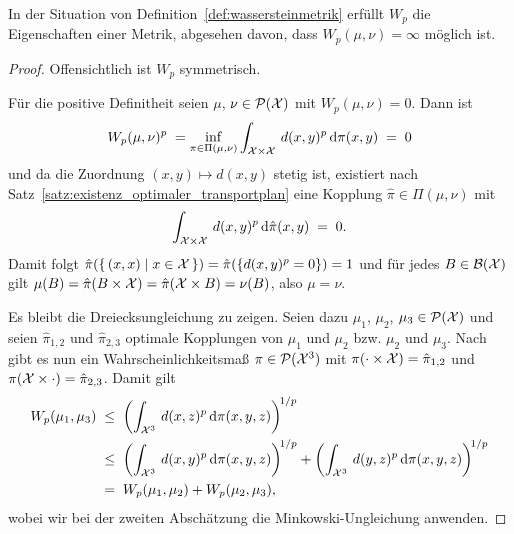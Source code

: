 \documentclass[../thesis/thesis.tex]{subfiles}
\begin{document}
	\begin{Satz}
		\label{satz:wassersteinmetrik_ist_metrik}
		In der Situation von Definition~\ref{def:wassersteinmetrik} erfüllt $W_p$ die Eigenschaften einer Metrik, abgesehen davon, dass $W_p(\mu, \nu) = \infty$ möglich ist.
	\end{Satz}

	\begin{proof}
		Offensichtlich ist $W_p$ symmetrisch.
		
		Für die positive Definitheit seien $\mu$, $\nu \in \mathcal{P}(\mathcal{X})$ mit $W_p(\mu, \nu) = 0$. Dann ist
		\[ W_p(\mu, \nu)^p \; = \inf_{\pi \in \Pi(\mu, \nu)} \int_{\mathcal{X} \times \mathcal{X}} \, d(x, y)^p \, \mathrm{d}\pi(x, y) \; = \; 0 \]
		und da die Zuordnung $(x, y) \mapsto d(x, y)$ stetig ist, existiert nach Satz~\ref{satz:existenz_optimaler_transportplan} eine Kopplung $\hat{\pi} \in \Pi(\mu, \nu)$ mit
		\[ \int_{\mathcal{X} \times \mathcal{X}} \, d(x, y)^p \, \mathrm{d}\hat{\pi}(x, y) \; = \; 0 \text{.} \]
		Damit folgt $\hat{\pi}(\left\{\, (x, x) \; \middle| \; x \in \mathcal{X} \,\right\}) = \hat{\pi}(\left\{d(x, y)^p = 0\right\}) = 1$ und für jedes $B \in \mathcal{B}(\mathcal{X})$ gilt
		$\mu(B) = \hat{\pi}(B \times \mathcal{X}) = \hat{\pi}(\mathcal{X} \times B) = \nu(B)$, also $\mu = \nu$.
		
		Es bleibt die Dreiecksungleichung zu zeigen. Seien dazu $\mu_1$, $\mu_2$, $\mu_3 \in \mathcal{P}(\mathcal{X})$ und seien $\hat{\pi}_{1, 2}$ und $\hat{\pi}_{2, 3}$ optimale Kopplungen von
		$\mu_1$ und $\mu_2$ bzw. $\mu_2$ und $\mu_3$. Nach \cite[S. 11--12]{Villani.2009} gibt es nun ein Wahrscheinlichkeitsmaß $\pi \in \mathcal{P}(\mathcal{X}^3)$ mit 
		$\pi(\cdot \times \mathcal{X}) = \hat{\pi}_{1, 2}$ und $\pi(\mathcal{X} \times \cdot) = \hat{\pi}_{2, 3}$. Damit gilt
		\begin{align*}
			W_p(\mu_1, \mu_3) \; &\leq \; \left(\int_{\mathcal{X}^3} \, d(x, z)^p \, \mathrm{d}\pi(x, y, z)\right)^{\! 1/p} \\
			                     &\leq \; \left(\int_{\mathcal{X}^3} \, d(x, y)^p \, \mathrm{d}\pi(x, y, z)\right)^{\! 1/p} + \left(\int_{\mathcal{X}^3} \, d(y, z)^p \, \mathrm{d}\pi(x, y, z)\right)^{\! 1/p} \\
			                     &=    \; W_p(\mu_1, \mu_2) + W_p(\mu_2, \mu_3) \text{,}
		\end{align*}
		wobei wir bei der zweiten Abschätzung die Minkowski-Ungleichung anwenden.
	\end{proof}
\end{document}
